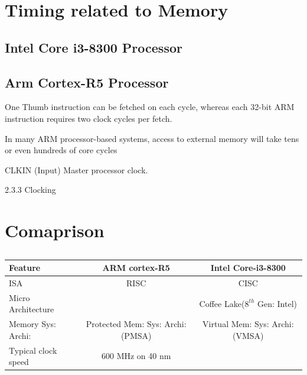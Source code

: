 \documentclass[a4paper,11pt]{article}
\begin{document}
\pagebreak
\section{Timing related to Memory}

\subsection{Intel Core i3-8300 Processor}
\subsection{Arm Cortex-R5 Processor}
One Thumb instruction can be fetched on each cycle, whereas each
32-bit ARM instruction requires two clock cycles per fetch.

In many ARM
processor-based systems, access to external memory will take tens or even hundreds of core cycles


CLKIN (Input) Master processor clock.

2.3.3 Clocking




\pagebreak
\section{Comaprison}
\begin{table}[!h]
	\centering
	\begin{tabular}{l ||c| c }
		\textbf{Feature} &\textbf{ARM cortex-R5}&\textbf{Intel Core-i3-8300}\\\hline
		ISA &RISC&CISC\\
		Micro Architecture &&Coffee Lake($8^{th}$ Gen: Intel)\\
		Memory Sys: Archi:&Protected Mem: Sys: Archi:(PMSA)&Virtual Mem: Sys: Archi:(VMSA)\\
		Typical clock speed&600 MHz on 40 nm&\\
		\hline\hline
	\end{tabular}
	\caption{}
\end{table}




\end{document}
